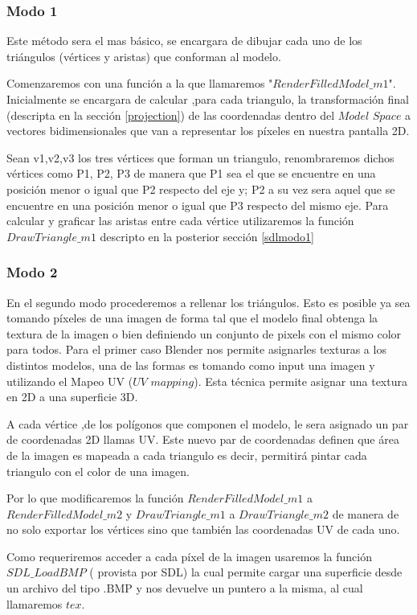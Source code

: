 \documentclass[a4paper]{article}
\newcounter{col}
\begin{document}
\subsubsection{Modo 1}  
Este método sera el mas básico, se encargara de dibujar cada uno de los triángulos (vértices y aristas) que conforman al modelo. 
\par Comenzaremos con una función a la que llamaremos "$RenderFilledModel\_m1$". Inicialmente se encargara de calcular ,para cada triangulo, la transformación final (descripta en la sección \ref{projection}) de las coordenadas dentro del $Model$ $Space$ a vectores bidimensionales que van a representar los píxeles en nuestra pantalla 2D.  
\par Sean v1,v2,v3 los tres vértices que forman un triangulo, renombraremos dichos vértices como P1, P2, P3 de manera que P1 sea el que se encuentre en una posición menor o igual que P2 respecto del eje y;  P2 a su vez sera aquel que se encuentre en una posición menor o igual que P3 respecto del mismo eje. Para calcular y graficar las aristas entre cada vértice utilizaremos la función $DrawTriangle\_m1$ descripto en la posterior sección \ref{sdlmodo1} 


\subsubsection{Modo 2}  
En el segundo modo procederemos a rellenar los triángulos. Esto es posible ya sea tomando píxeles de una imagen de forma tal que el modelo final obtenga la textura de la imagen o bien definiendo un conjunto de pixels con el mismo color para todos. Para el primer caso Blender nos permite asignarles texturas a los distintos modelos, una de las formas es tomando como input una imagen y utilizando el Mapeo UV ($UV$ $mapping$). Esta técnica permite asignar una textura en 2D a una superficie 3D. 
\par A cada vértice ,de los polígonos que componen el modelo, le sera asignado un par de coordenadas 2D llamas UV. Este nuevo par de coordenadas definen que área de la imagen es mapeada a cada triangulo es decir, permitirá pintar cada triangulo con el color de una imagen. 
\par Por lo que modificaremos la función $RenderFilledModel\_m1$ a $RenderFilledModel\_m2$ y $DrawTriangle\_m1$ a $DrawTriangle\_m2$ de manera de no solo exportar los vértices sino que también las coordenadas UV de cada uno.
\par Como requeriremos acceder a cada píxel de la imagen usaremos la función $SDL\_LoadBMP$ ( provista por SDL) la cual permite cargar una superficie desde un archivo del tipo .BMP y nos devuelve un puntero a la misma, al cual llamaremos $tex$.
\end{document}
